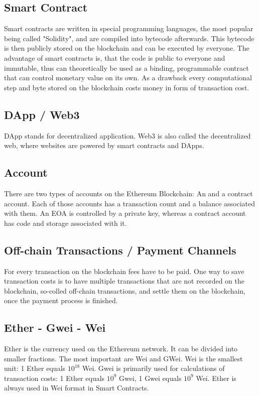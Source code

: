 \subsection{Smart Contract}
Smart contracts are written in special programming languages, the most popular being called "Solidity", and are compiled into bytecode afterwards. This bytecode is then publicly stored on the blockchain and can be executed by everyone. The advantage of smart contracts is, that the code is public to everyone and immutable, thus can theoretically be used as a binding, programmable contract that can control monetary value on its own. As a drawback every computational step and byte stored on the blockchain costs money in form of transaction cost.
\\

\subsection{DApp / Web3}
DApp stands for decentralized application. Web3 is also called the decentralized web, where websites are powered by smart contracts and DApps. 
\\

\subsection{Account}
There are two types of accounts on the Ethereum Blockchain: An  and a contract account. Each of those accounts has a transaction count and a balance\cite{ethereum-yellow-paper} associated with them. An EOA is controlled by a private key, whereas a contract account has code and storage associated with it.
\\

\subsection{Off-chain Transactions / Payment Channels}
For every transaction on the blockchain fees have to be paid. One way to save transaction costs is to have multiple transactions that are not recorded on the blockchain, so-colled off-chain transactions, and settle them on the blockchain, once the payment process is finished.
\\

\subsection{Ether - Gwei - Wei}
Ether is the currency used on the Ethereum network. It can be divided into smaller fractions. The most important are Wei and GWei. Wei is the smallest unit: 1 Ether equals \(10^{18}\) Wei\cite{ethereum-yellow-paper}. Gwei is primarily used for calculations of transaction costs: 1 Ether equals \(10^{9}\) Gwei, 1 Gwei equals \(10^{9}\) Wei. Ether is always used in Wei format in Smart Contracts.
\\

